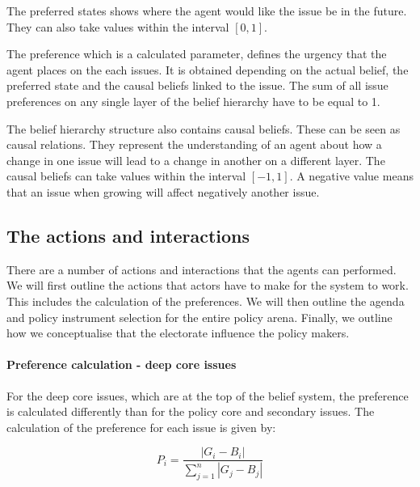 \documentclass[11pt]{article}
\begin{document}
The preferred states shows where the agent would like the issue be in the future. They can also take values within the interval $[0, 1]$.

The preference which is a calculated parameter, defines the urgency that the agent places on the each issues. It is obtained depending on the actual belief, the preferred state and the causal beliefs linked to the issue. The sum of all issue preferences on any single layer of the belief hierarchy have to be equal to 1.

The belief hierarchy structure also contains causal beliefs. These can be seen as causal relations. They represent the understanding of an agent about how a change in one issue will lead to a change in another on a different layer. The causal beliefs can take values within the interval $[-1, 1]$. A negative value means that an issue when growing will affect negatively another issue.



\subsection{The actions and interactions}


There are a number of actions and interactions that the agents can performed. We will first outline the actions that actors have to make for the system to work. This includes the calculation of the preferences. We will then outline the agenda and policy instrument selection for the entire policy arena. Finally, we outline how we conceptualise that the electorate influence the policy makers.

\paragraph{Preference calculation - deep core issues}

For the deep core issues, which are at the top of the belief system, the preference is calculated differently than for the policy core and secondary issues. The calculation of the preference for each issue is given by:

\begin{equation}
P_i = \frac{ |G_i - B_i|}{\sum_{j=1}^n |G_j - B_j|}
\end{equation}
\end{document}

